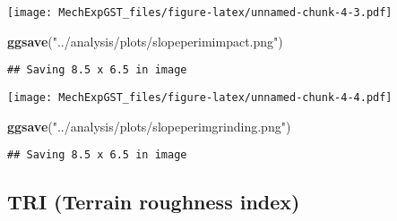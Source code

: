 \documentclass[
]{article}
\newenvironment{Shaded}{\begin{snugshade}}{\end{snugshade}}
\newcommand{\DataTypeTok}[1]{\textcolor[rgb]{0.13,0.29,0.53}{#1}}
\newcommand{\KeywordTok}[1]{\textcolor[rgb]{0.13,0.29,0.53}{\textbf{#1}}}
\newcommand{\NormalTok}[1]{#1}
\newcommand{\OperatorTok}[1]{\textcolor[rgb]{0.81,0.36,0.00}{\textbf{#1}}}
\newcommand{\StringTok}[1]{\textcolor[rgb]{0.31,0.60,0.02}{#1}}
\begin{document}
\texttt{[image: MechExpGST\_files/figure-latex/unnamed-chunk-4-3.pdf]}

\begin{Shaded}
\begin{Highlighting}[]
\KeywordTok{ggsave}\NormalTok{(}\StringTok{"../analysis/plots/slopeperimimpact.png"}\NormalTok{)}
\end{Highlighting}
\end{Shaded}

\begin{verbatim}
## Saving 8.5 x 6.5 in image
\end{verbatim}

\begin{Shaded}
\end{Shaded}

\texttt{[image: MechExpGST\_files/figure-latex/unnamed-chunk-4-4.pdf]}

\begin{Shaded}
\begin{Highlighting}[]
\KeywordTok{ggsave}\NormalTok{(}\StringTok{"../analysis/plots/slopeperimgrinding.png"}\NormalTok{)}
\end{Highlighting}
\end{Shaded}

\begin{verbatim}
## Saving 8.5 x 6.5 in image
\end{verbatim}

\hypertarget{tri-terrain-roughness-index}{%
\subsection{TRI (Terrain roughness
index)}\label{tri-terrain-roughness-index}}
\end{document}
